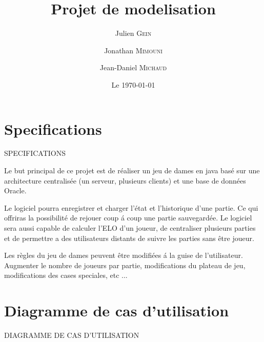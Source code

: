 \documentclass[french,12pt]{report}
\title{Projet de modelisation}
\author{Julien \textsc{Gein}
\and Jonathan \textsc{Mimouni}
\and Jean-Daniel \textsc{Michaud}}
\date{Le \today}
\begin{document}
\maketitle
\strut\thispagestyle{empty}
\vfill
\pagebreak
\setcounter{page}{1}
\tableofcontents
\pagebreak

\sloppy


\section*{Specifications}
{\uppercase{Specifications}}

Le but principal de ce projet est de r\'ealiser un jeu de dames en java
bas\'e sur une architecture centralis\'ee (un serveur, plusieurs clients)
et une base de donn\'ees Oracle.

Le logiciel pourra enregistrer et charger l'\'etat et l'historique
d'une partie. Ce qui offriras la possibilit\'e de rejouer coup \'a coup
une partie sauvegard\'ee. Le logiciel sera aussi capable de calculer
l'ELO d'un joueur, de centraliser plusieurs parties et de permettre
a des utilisateurs distants de suivre les parties sans \^etre joueur.

Les r\`egles du jeu de dames peuvent \^etre modifi\'ees \'a la guise de
l'utilisateur. Augmenter le nombre de joueurs par partie, modifications du 
plateau de jeu, modifications des cases speciales, etc ...


\pagebreak

\section*{Diagramme de cas d'utilisation}
{\uppercase{Diagramme de cas d'utilisation}}
\end{document}
